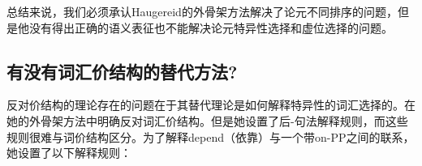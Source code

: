 \begin{exe}
\begin{xlist}[iv.]
\begin{exe}
\begin{xlist}[iv.]

总结来说，我们必须承认Haugereid的外骨架方法解决了论元不同排序的问题，但是他没有得出正确的语义表征也不能解决论元特异性选择和虚位选择的问题。

\subsection{有没有词汇价结构的替代方法?}
\label{sec-borer}

反对价结构的理论存在的问题在于其替代理论是如何解释特异性的词汇选择的。\citet{Borer2005a-u}在她的外骨架方法中明确反对词汇价结构。但是她设置了后-句法解释规则，而这些规则很难与词价结构区分。为了解释depend（依靠）与一个带on-PP之间的联系，她设置了以下解释规则\citep[Vol.\ II, p.\,29]{Borer2005a-u}：


\end{xlist}
\end{exe}
\end{xlist}
\end{exe}
